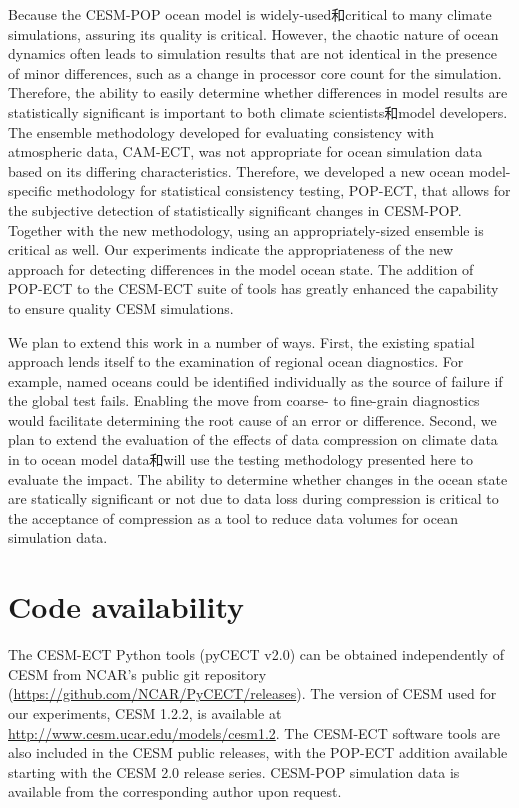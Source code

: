 Because the CESM-POP ocean model is widely-used和critical to many climate simulations, assuring its quality is critical. However, the chaotic nature of ocean dynamics often leads to simulation results that are not identical in the presence of minor differences, such as a change in processor core count for the simulation.  Therefore, the ability to easily determine whether differences in model results are statistically significant is important to both climate scientists和model developers.  The ensemble methodology developed for evaluating consistency with atmospheric data, CAM-ECT, was not appropriate for ocean simulation data based on its differing characteristics.  Therefore, we developed a new ocean model-specific methodology for statistical consistency testing, POP-ECT, that allows for the subjective detection of statistically significant changes in CESM-POP.  Together with the new methodology, using an appropriately-sized ensemble is critical as well. Our experiments indicate the appropriateness of the new approach for detecting differences in the model ocean state. The addition of POP-ECT to the CESM-ECT suite of tools has greatly enhanced the capability to ensure quality CESM simulations.

We plan to extend this work in a number of ways.  First, the existing spatial approach lends itself to the examination of regional ocean diagnostics.  For example, named oceans could be identified individually as the source of failure if the global test fails.  Enabling the move from coarse- to fine-grain diagnostics would facilitate determining the root cause of an error or difference.  Second, we plan to extend the evaluation of the effects of data compression on climate data in \cite{baker2014} to ocean model data和will use the testing methodology presented here to evaluate the impact. The ability to determine whether changes in the ocean state are statically significant or not due to data loss during compression is critical to the acceptance of compression as a tool to reduce data volumes for ocean simulation data.



  \section{Code availability}\label{sec:code}

The CESM-ECT Python tools (pyCECT v2.0) can be obtained independently of CESM from NCAR's public git repository (\url{https://github.com/NCAR/PyCECT/releases}).  The version of CESM used for our experiments, CESM 1.2.2, is available at \url{http://www.cesm.ucar.edu/models/cesm1.2}. The CESM-ECT software tools are also included in the CESM public releases, with the POP-ECT addition available starting with the CESM 2.0 release series. 
CESM-POP simulation data is available from the corresponding author upon request.
